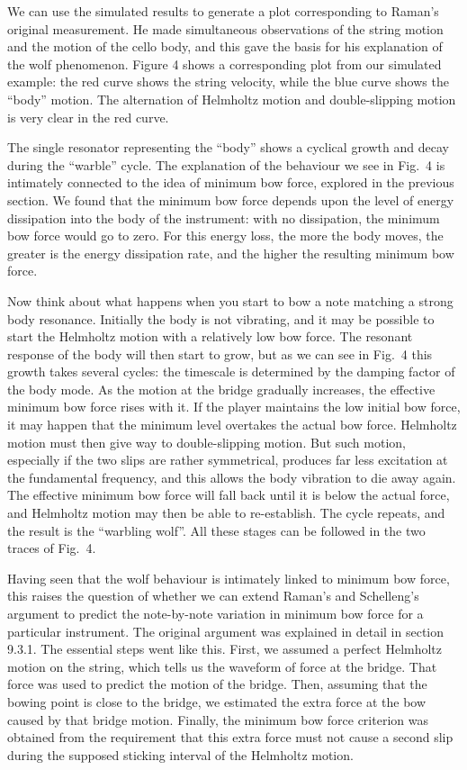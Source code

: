   We can use the simulated results to generate a plot corresponding to Raman's 
  original measurement. He made simultaneous observations of the string motion 
  and the motion of the cello body, and this gave the basis for his explanation 
  of the wolf phenomenon. Figure 4 shows a corresponding plot from our 
  simulated example: the red curve shows the string velocity, while the blue 
  curve shows the ``body'' motion. The alternation of Helmholtz motion and 
  double-slipping motion is very clear in the red curve. 

  The single resonator representing the ``body'' shows a cyclical growth and 
  decay during the ``warble'' cycle. The explanation of the behaviour we see in 
  Fig.\ 4 is intimately connected to the idea of minimum bow force, explored in 
  the previous section. We found that the minimum bow force depends upon the 
  level of energy dissipation into the body of the instrument: with no 
  dissipation, the minimum bow force would go to zero. For this energy loss, 
  the more the body moves, the greater is the energy dissipation rate, and the 
  higher the resulting minimum bow force. 

  Now think about what happens when you start to bow a note matching a strong 
  body resonance. Initially the body is not vibrating, and it may be possible 
  to start the Helmholtz motion with a relatively low bow force. The resonant 
  response of the body will then start to grow, but as we can see in Fig.\ 4 
  this growth takes several cycles: the timescale is determined by the damping 
  factor of the body mode. As the motion at the bridge gradually increases, the 
  effective minimum bow force rises with it. If the player maintains the low 
  initial bow force, it may happen that the minimum level overtakes the actual 
  bow force. Helmholtz motion must then give way to double-slipping motion. But 
  such motion, especially if the two slips are rather symmetrical, produces far 
  less excitation at the fundamental frequency, and this allows the body 
  vibration to die away again. The effective minimum bow force will fall back 
  until it is below the actual force, and Helmholtz motion may then be able to 
  re-establish. The cycle repeats, and the result is the “warbling wolf”. All 
  these stages can be followed in the two traces of Fig.\ 4. 

  Having seen that the wolf behaviour is intimately linked to minimum bow 
  force, this raises the question of whether we can extend Raman’s and 
  Schelleng’s argument to predict the note-by-note variation in minimum bow 
  force for a particular instrument. The original argument was explained in 
  detail in section 9.3.1. The essential steps went like this. First, we 
  assumed a perfect Helmholtz motion on the string, which tells us the waveform 
  of force at the bridge. That force was used to predict the motion of the 
  bridge. Then, assuming that the bowing point is close to the bridge, we 
  estimated the extra force at the bow caused by that bridge motion. Finally, 
  the minimum bow force criterion was obtained from the requirement that this 
  extra force must not cause a second slip during the supposed sticking 
  interval of the Helmholtz motion. 

